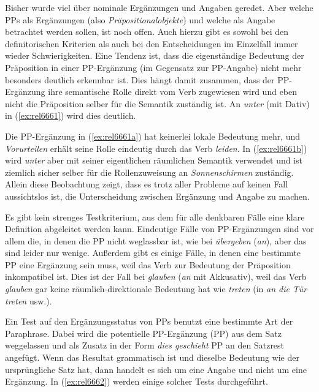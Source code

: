 \label{sec:ppergang}

Bisher wurde viel über nominale Ergänzungen und Angaben geredet.
Aber welche PPs als Ergänzungen (also \textit{Präpositionalobjekte}) und welche als Angabe betrachtet werden sollen, ist noch offen.
Auch hierzu gibt es sowohl bei den definitorischen Kriterien als auch bei den Entscheidungen im Einzelfall immer wieder Schwierigkeiten.
Eine Tendenz ist, dass die eigenständige Bedeutung der Präposition in einer PP-Ergänzung (im Gegensatz zur PP-Angabe) nicht mehr besonders deutlich erkennbar ist.
Dies hängt damit zusammen, dass der PP-Ergänzung ihre semantische Rolle direkt vom Verb zugewiesen wird und eben nicht die Präposition selber für die Semantik zuständig ist.
An \textit{unter} (mit Dativ) in (\ref{ex:rel6661}) wird dies deutlich.

\begin{exe}
  \ex\label{ex:rel6661} 
  \begin{xlist}
  \end{xlist}
\end{exe}

Die PP-Ergänzung in (\ref{ex:rel6661a}) hat keinerlei lokale Bedeutung mehr, und \textit{Vorurteilen} erhält seine Rolle eindeutig durch das Verb \textit{leiden}.
In (\ref{ex:rel6661b}) wird \textit{unter} aber mit seiner eigentlichen räumlichen Semantik verwendet und ist ziemlich sicher selber für die Rollenzuweisung an \textit{Sonnenschirmen} zuständig.
Allein diese Beobachtung zeigt, dass es trotz aller Probleme auf keinen Fall aussichtslos ist, die Unterscheidung zwischen Ergänzung und Angabe zu machen.

Es gibt kein strenges Testkriterium, aus dem für alle denkbaren Fälle eine klare Definition abgeleitet werden kann.
Eindeutige Fälle von PP-Ergänzungen sind vor allem die, in denen die PP nicht weglassbar ist, wie bei \textit{übergeben} (\textit{an}), aber das sind leider nur wenige.
Außerdem gibt es einige Fälle, in denen eine bestimmte PP eine Ergänzung sein muss, weil das Verb zur Bedeutung der Präposition inkompatibel ist.
Dies ist \zB der Fall bei \textit{glauben} (\textit{an} mit Akkusativ), weil das Verb \textit{glauben} gar keine räumlich-direktionale Bedeutung hat wie \zB \textit{treten} (in \textit{an die Tür treten} usw.).

Ein Test auf den Ergänzungsstatus von PPs benutzt eine bestimmte Art der Paraphrase.
Dabei wird die potentielle PP-Ergänzung (PP) aus dem Satz weggelassen und als Zusatz in der Form \textit{dies geschieht} PP an den Satzrest angefügt.
Wenn das Resultat grammatisch ist und dieselbe Bedeutung wie der ursprüngliche Satz hat, dann handelt es sich um eine Angabe und nicht um eine Ergänzung.
In (\ref{ex:rel6662}) werden einige solcher Tests durchgeführt.

